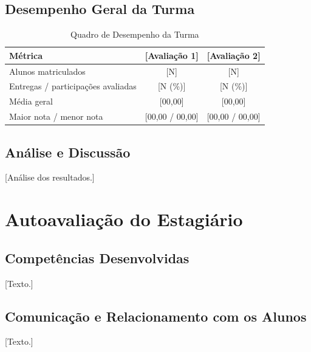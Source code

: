\documentclass[12pt]{article}
\newif\ifmostrarinstrucoes
\newcommand{\instrucao}[1]{%
  \ifmostrarinstrucoes
  \begin{tcolorbox}[colback=instrbg, colframe=dccblue, arc=2mm, boxrule=0.6pt,
    title=\textbf{INSTRUÇÃO (apagar na versão final)}, fonttitle=\small]
  \small #1
  \end{tcolorbox}
  \fi}
\begin{document}
\subsection{Desempenho Geral da Turma}
\begin{table}[H]
\centering\small
\caption{Quadro de Desempenho da Turma}\label{tab:desempenho}
\vspace{0.2cm}
\begin{tabular}{lcc}
\toprule
\textbf{Métrica} & \textbf{[Avaliação 1]} & \textbf{[Avaliação 2]} \\
\midrule
Alunos matriculados & [N] & [N] \\
Entregas / participações avaliadas & [N (\%)] & [N (\%)] \\
Média geral & [00,00] & [00,00] \\
Maior nota / menor nota & [00,00 / 00,00] & [00,00 / 00,00] \\
\bottomrule
\end{tabular}
\end{table}

\subsection{Análise e Discussão}
\instrucao{Interprete os números: dificuldades recorrentes, evolução ao longo do semestre, efeito das ações de apoio, ocorrência de recursos de nota.}
[Análise dos resultados.]

\newpage
\section{Autoavaliação do Estagiário}\label{sec:autoavaliacao}
\instrucao{Item 4 das Diretrizes: reflexão crítica e honesta sobre sua atuação. Sugestão de eixos: competências docentes desenvolvidas, comunicação com os alunos, gestão de tempo/conciliação com a pós-graduação, pontos fortes, pontos a melhorar e contribuição para a vocação docente. O relatório é avaliado nos critérios: cumprimento dos objetivos, qualidade do apoio, disponibilidade e assiduidade, motivação e desenvoltura.}
\subsection{Competências Desenvolvidas}
[Texto.]
\subsection{Comunicação e Relacionamento com os Alunos}
[Texto.]
\end{document}
